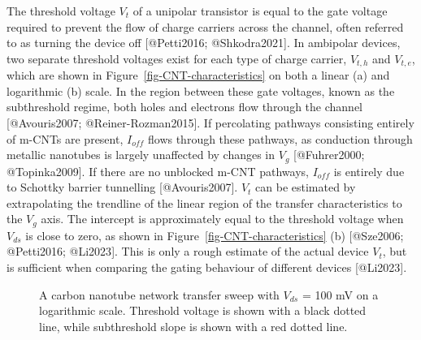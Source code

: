 \documentclass[
  letterpaper,
  DIV=11,
  numbers=noendperiod]{scrartcl}
\begin{document}
The threshold voltage \(V_t\) of a unipolar transistor is equal to the
gate voltage required to prevent the flow of charge carriers across the
channel, often referred to as turning the device off {[}@Petti2016;
@Shkodra2021{]}. In ambipolar devices, two separate threshold voltages
exist for each type of charge carrier, \(V_{t,h}\) and \(V_{t,e}\),
which are shown in Figure~\ref{fig-CNT-characteristics} on both a linear
(a) and logarithmic (b) scale. In the region between these gate
voltages, known as the subthreshold regime, both holes and electrons
flow through the channel {[}@Avouris2007; @Reiner-Rozman2015{]}. If
percolating pathways consisting entirely of m-CNTs are present,
\(I_{off}\) flows through these pathways, as conduction through metallic
nanotubes is largely unaffected by changes in \(V_g\) {[}@Fuhrer2000;
@Topinka2009{]}. If there are no unblocked m-CNT pathways, \(I_{off}\)
is entirely due to Schottky barrier tunnelling {[}@Avouris2007{]}.
\(V_t\) can be estimated by extrapolating the trendline of the linear
region of the transfer characteristics to the \(V_g\) axis. The
intercept is approximately equal to the threshold voltage when
\(V_{ds}\) is close to zero, as shown in
Figure~\ref{fig-CNT-characteristics} (b) {[}@Sze2006; @Petti2016;
@Li2023{]}. This is only a rough estimate of the actual device \(V_t\),
but is sufficient when comparing the gating behaviour of different
devices {[}@Li2023{]}.

\begin{figure}


\caption{\label{fig-subthreshold-slope}A carbon nanotube network
transfer sweep with \(V_{ds}\) = 100 mV on a logarithmic scale.
Threshold voltage is shown with a black dotted line, while subthreshold
slope is shown with a red dotted line.}

\end{figure}%
\end{document}
